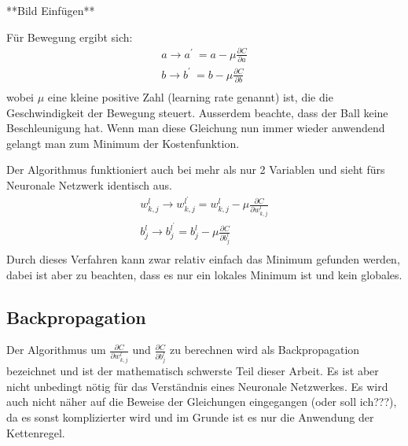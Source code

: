\documentclass[12pt,a4paper]{report}
\begin{document}
**Bild Einfügen**

Für Bewegung ergibt sich:
\begin{gather*}
    a \rightarrow a^\prime\ = a - \mu\frac{\partial C}{\partial a}\\
    b \rightarrow b^\prime\ = b - \mu\frac{\partial C}{\partial b}\\
\end{gather*}
wobei $\mu$ eine kleine positive Zahl (learning rate genannt) ist, die die Geschwindigkeit der Bewegung steuert.
Ausserdem beachte, dass der Ball keine Beschleunigung hat.
Wenn man diese Gleichung nun immer wieder anwendend gelangt man zum Minimum der Kostenfunktion.

Der Algorithmus funktioniert auch bei mehr als nur 2 Variablen und sieht fürs Neuronale Netzwerk identisch aus.
\begin{gather*}
    w^l_{k,j} \rightarrow w^{l^\prime}_{k,j} = w^l_{k,j} - \mu\frac{\partial C}{\partial w^l_{k,j}}\\
    b^l_j \rightarrow b^{l^\prime}_j = b^l_j - \mu\frac{\partial C}{\partial b^l_j}\\
\end{gather*}
Durch dieses Verfahren kann zwar relativ einfach das Minimum gefunden werden, dabei ist aber zu beachten, dass es nur ein lokales
Minimum ist und kein globales.

\subsection{Backpropagation}
Der Algorithmus um $\frac{\partial C}{\partial w^l_{k,j}}$ und $\frac{\partial C}{\partial b^l_j}$ zu berechnen wird als
Backpropagation bezeichnet und ist der mathematisch schwerste Teil dieser Arbeit.
Es ist aber nicht unbedingt nötig für das Verständnis eines Neuronale Netzwerkes.
Es wird auch nicht näher auf die Beweise der Gleichungen eingegangen (oder soll ich???),
da es sonst komplizierter wird und im Grunde ist es nur die Anwendung der Kettenregel.
\end{document}
